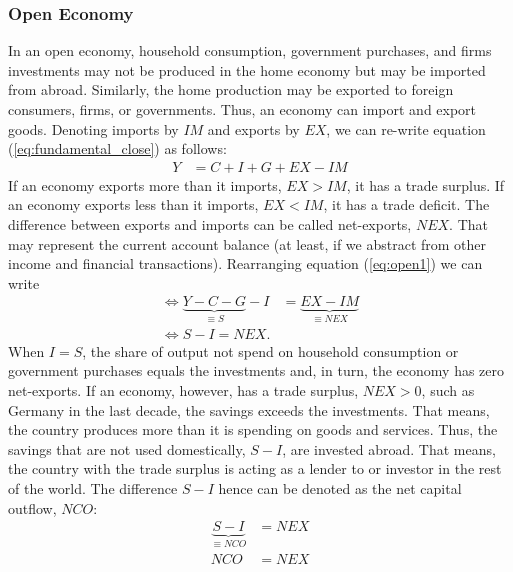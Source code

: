 \subsubsection*{Open Economy}
In an open economy, household consumption, government purchases, and firms investments may not be produced in the home economy but may be imported from abroad. Similarly, the home production may be exported to foreign consumers, firms, or governments. Thus, an economy can import and export goods.
Denoting imports by $IM$ and exports by $EX$, we can re-write equation (\ref{eq:fundamental_close}) as follows:
\begin{align}
	Y&=C+I+G+EX-IM\label{eq:open1}
\end{align}
If an economy exports more than  it imports, $EX>IM$, it has a trade surplus. If  an economy exports less than it imports, $EX<IM$, it has a trade deficit. The difference between exports and imports can be called net-exports, $NEX$. That may represent the current account balance (at least, if we abstract from other income and financial transactions). Rearranging equation (\ref{eq:open1}) we can write
\begin{align}
	\Leftrightarrow	\underbrace{Y-C-G}_{\equiv S}-I&=\underbrace{EX-IM}_{\equiv NEX}\\
	\Leftrightarrow S-I=NEX.
\end{align}
When $I=S$, the share of output not spend on household consumption or government purchases equals the investments and, in turn, the economy has zero net-exports. If an economy, however, has a trade surplus, $NEX>0$, such as Germany in the last decade, the savings exceeds the investments. That means, the country produces more than it is spending on goods and services. Thus, the savings that are not used domestically, $S-I$, are invested abroad. That means, the country with the trade surplus is acting as a lender to or investor in the rest of the world.
The difference $S-I$ hence can be denoted as the net capital outflow, $NCO$:
\begin{align}
	\underbrace{S-I}_{\equiv NCO}&=NEX\\
	NCO&=NEX
\end{align}


